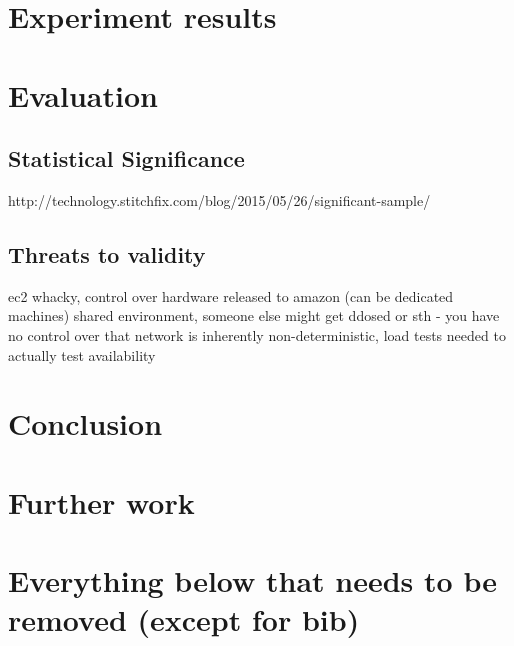 \documentclass{uvamscse}
\begin{document}
\chapter{Experiment results}

\chapter{Evaluation}

\section{Statistical Significance}
http://technology.stitchfix.com/blog/2015/05/26/significant-sample/

\section{Threats to validity}
ec2 whacky, control over hardware released to amazon (can be dedicated machines)
shared environment, someone else might get ddosed or sth - you have no control over that
network is inherently non-deterministic, load tests needed to actually test availability


\chapter{Conclusion}

\chapter{Further work}

\chapter{Everything below that needs to be removed (except for bib)}
\end{document}
